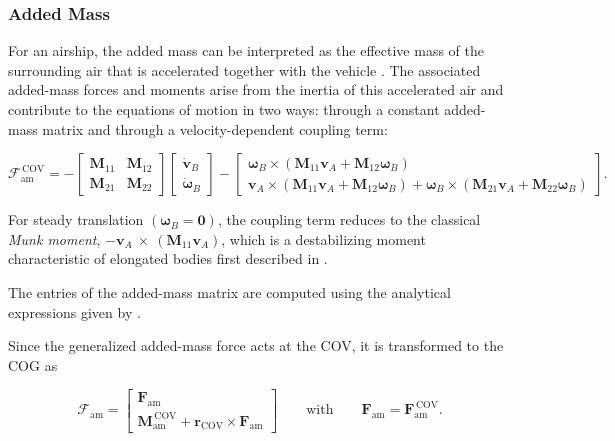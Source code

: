 \subsubsection{Added Mass}
For an airship, the added mass can be interpreted as the effective mass of the surrounding air that is accelerated together with the vehicle \cite{Newman1977Hydrodynamics}.
The associated added-mass forces and moments arise from the inertia of this accelerated air and contribute to the equations of motion in two ways: through a constant added-mass matrix and through a velocity-dependent coupling term:


\begin{equation}
	\bm{\mathcal{F}}_\mathrm{am}^\mathrm{\, COV}
	=
	-\begin{bmatrix} 
		\bm{M}_{11} & \bm{M}_{12} \\ \bm{M}_{21} & \bm{M}_{22}
	\end{bmatrix}
	\begin{bmatrix}
		\dot{\bm{v}}_B \\ \dot{\bm{\omega}}_B
	\end{bmatrix}
	-
	\begin{bmatrix}
		\bm{\omega}_B \times \left( \bm{M}_{11} \bm{v}_A + \bm{M}_{12} \bm{\omega}_B \right) 
		\\
		\bm{v}_A \times \left( \bm{M}_{11} \bm{v}_A + \bm{M}_{12} \bm{\omega}_B \right) 
		+ 
		\bm{\omega}_B \times \left( \bm{M}_{21} \bm{v}_A + \bm{M}_{22} \bm{\omega}_B \right)
	\end{bmatrix}.
\end{equation}

For steady translation $\left( \bm{\omega}_B = \bm{0} \right)$, the coupling term reduces to the classical \emph{Munk moment}, $-\bm{v}_A~\times~\left( \bm{M}_{11} \bm{v}_A \right)$, which is a destabilizing moment characteristic of elongated bodies first described in \cite{Munk1924Aerodynamic}.

The entries of the added-mass matrix are computed using the analytical expressions given by \cite{Li2007AirshipDynamics}.

Since the generalized added-mass force acts at the COV, it is transformed to the COG as

\begin{equation}
	\bm{\mathcal{F}}_\mathrm{am}
	=
	\begin{bmatrix}
		\bm{F}_\mathrm{am} \\ 
		\bm{M}_\mathrm{am}^\mathrm{\, COV} + \bm{r}_\mathrm{COV} \times \bm{F}_\mathrm{am} 
	\end{bmatrix}
	\qquad
	\text{with}
	\qquad
	\bm{F}_\mathrm{am}
	=
	\bm{F}_\mathrm{am}^{\mathrm{\, COV}}.	
\end{equation}





